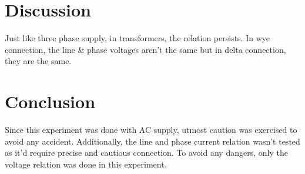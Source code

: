 \documentclass[12pt]{article}
\begin{document}
\section{Discussion}
Just like three phase supply, in transformers, the relation persists. In wye connection, the line \& phase voltages aren't the same but in delta connection, they are the same.


\section{Conclusion}
Since this experiment was done with AC supply, utmost caution was exercised to avoid any accident. Additionally, the line and phase current relation wasn't tested as it'd require precise and cautious connection. To avoid any dangers, only the voltage relation was done in this experiment.


\end{document}
